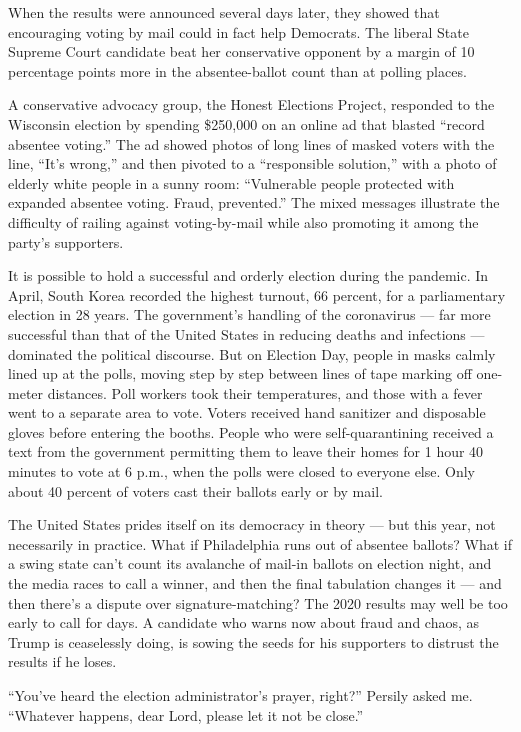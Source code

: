 When the results were announced several days later, they showed that
encouraging voting by mail could in fact help Democrats. The liberal
State Supreme Court candidate beat her conservative opponent by a margin
of 10 percentage points more in the absentee-ballot count than at
polling places.

A conservative advocacy group, the Honest Elections Project, responded
to the Wisconsin election by spending \$250,000 on an online ad that
blasted ``record absentee voting.'' The ad showed photos of long lines
of masked voters with the line, ``It's wrong,'' and then pivoted to a
``responsible solution,'' with a photo of elderly white people in a
sunny room: ``Vulnerable people protected with expanded absentee voting.
Fraud, prevented.'' The mixed messages illustrate the difficulty of
railing against voting-by-mail while also promoting it among the party's
supporters.

It is possible to hold a successful and orderly election during the
pandemic. In April, South Korea recorded the highest turnout, 66
percent, for a parliamentary election in 28 years. The government's
handling of the coronavirus --- far more successful than that of the
United States in reducing deaths and infections --- dominated the
political discourse. But on Election Day, people in masks calmly lined
up at the polls, moving step by step between lines of tape marking off
one-meter distances. Poll workers took their temperatures, and those
with a fever went to a separate area to vote. Voters received hand
sanitizer and disposable gloves before entering the booths. People who
were self-quarantining received a text from the government permitting
them to leave their homes for 1 hour 40 minutes to vote at 6 p.m., when
the polls were closed to everyone else. Only about 40 percent of voters
cast their ballots early or by mail.

The United States prides itself on its democracy in theory --- but this
year, not necessarily in practice. What if Philadelphia runs out of
absentee ballots? What if a swing state can't count its avalanche of
mail-in ballots on election night, and the media races to call a winner,
and then the final tabulation changes it --- and then there's a dispute
over signature-matching? The 2020 results may well be too early to call
for days. A candidate who warns now about fraud and chaos, as Trump is
ceaselessly doing, is sowing the seeds for his supporters to distrust
the results if he loses.

``You've heard the election administrator's prayer, right?'' Persily
asked me. ``Whatever happens, dear Lord, please let it not be close.''

